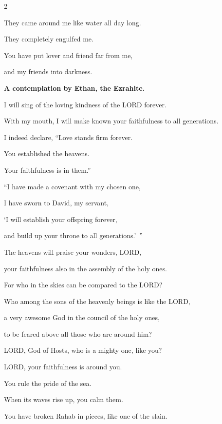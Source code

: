 \begin{multicols}{2}
	
	\myverse{}They came around me like water all day long.
	
	They completely engulfed me.
	
	
	\myverse{}You have put lover and friend far from me,
	
	and my friends into darkness.
	
	
	\mychapter{}\textbf{A contemplation by Ethan, the Ezrahite.}
	
	\quad \myverse*{}I will sing of the loving kindness of the LORD forever.
	
	With my mouth, I will make known your faithfulness to all generations.
	
	
	\myverse{}I indeed declare, “Love stands firm forever.
	
	You established the heavens.
	
	Your faithfulness is in them.”
	
	\vspace{\baselineskip}
	
	\myverse{}“I have made a covenant with my chosen one,
	
	I have sworn to David, my servant,
	
	
	\myverse{}‘I will establish your offspring forever,
	
	and build up your throne to all generations.’ ”
	
	\vspace{\baselineskip}
	
	
	\myverse{}The heavens will praise your wonders, LORD,
	
	your faithfulness also in the assembly of the holy ones.
	
	
	\myverse{}For who in the skies can be compared to the LORD?
	
	Who among the sons of the heavenly beings is like the LORD,
	
	
	\myverse{}a very awesome God in the council of the holy ones,
	
	to be feared above all those who are around him?
	
	
	\myverse{}LORD, God of Hosts, who is a mighty one, like you?
	
	LORD, your faithfulness is around you.
	
	
	\myverse{}You rule the pride of the sea.
	
	When its waves rise up, you calm them.
	
	
	\myverse{}You have broken Rahab in pieces, like one of the slain.
	

\end{multicols}
